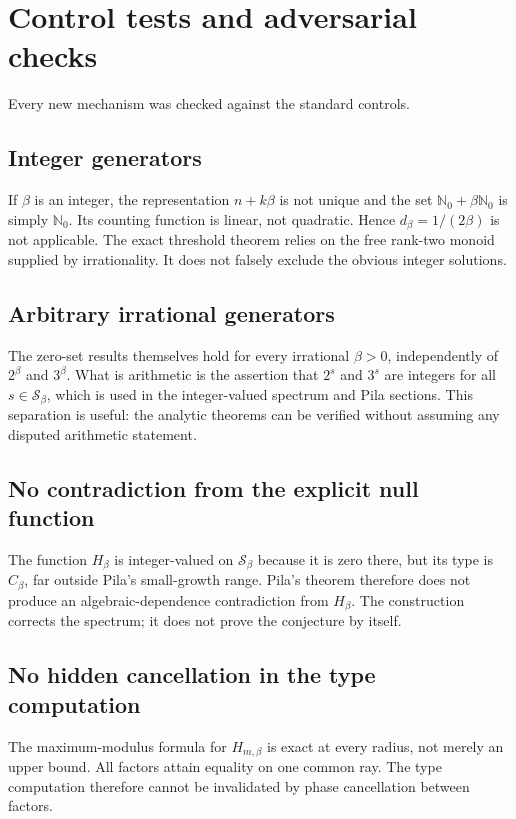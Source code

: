 \documentclass[11pt,oneside]{article}
\theoremstyle{definition}
\theoremstyle{remark}
\newcommand{\Nzero}{\mathbb N_0}
\newcommand{\Sbeta}{\mathcal S_\beta}
\newcommand{\Cbeta}{C_\beta}
\begin{document}
\section{Control tests and adversarial checks}
\label{sec:controls}

Every new mechanism was checked against the standard controls.

\subsection{Integer generators}

If $\beta$ is an integer, the representation $n+k\beta$ is not unique and the set
$\Nzero+\beta\Nzero$ is simply $\Nzero$.  Its counting function is linear, not quadratic.
Hence $d_\beta=1/(2\beta)$ is not applicable.  The exact threshold theorem relies on the
free rank-two monoid supplied by irrationality.  It does not falsely exclude the obvious
integer solutions.

\subsection{Arbitrary irrational generators}

The zero-set results themselves hold for every irrational $\beta>0$, independently of
$2^\beta$ and $3^\beta$.  What is arithmetic is the assertion that $2^s$ and $3^s$ are
integers for all $s\in\Sbeta$, which is used in the integer-valued spectrum and Pila
sections.  This separation is useful: the analytic theorems can be verified without assuming
any disputed arithmetic statement.

\subsection{No contradiction from the explicit null function}

The function $H_\beta$ is integer-valued on $\Sbeta$ because it is zero there, but its type
is $\Cbeta$, far outside Pila's small-growth range.  Pila's theorem therefore does not
produce an algebraic-dependence contradiction from $H_\beta$.  The construction corrects
the spectrum; it does not prove the conjecture by itself.

\subsection{No hidden cancellation in the type computation}

The maximum-modulus formula for $H_{m,\beta}$ is exact at every radius, not merely an upper
bound.  All factors attain equality on one common ray.  The type computation therefore
cannot be invalidated by phase cancellation between factors.
\end{document}

